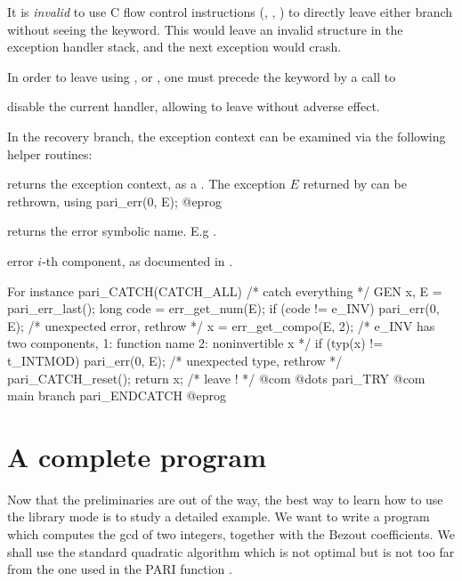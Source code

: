 \item It is \emph{invalid} to use C flow control instructions (,
, ) to directly leave either branch without seeing
the  keyword. This would leave an invalid structure in the
exception handler stack, and the next exception would crash.

\item In order to leave using ,  or ,
one must precede the keyword by a call to

 disable the current handler, allowing to leave
without adverse effect.


In the recovery branch, the exception context can be examined via the
following helper routines:

 returns the exception context, as a .
The exception $E$ returned by  can be rethrown, using
\bprog
  pari_err(0, E);
@eprog

 returns the error symbolic name. E.g
.

 error $i$-th component, as documented
in .

\noindent For instance
\bprog
 pari_CATCH(CATCH_ALL) { /* catch everything */
    GEN x, E = pari_err_last();
    long code = err_get_num(E);
    if (code != e_INV) pari_err(0, E); /* unexpected error, rethrow */
    x = err_get_compo(E, 2);
    /* e_INV has two components, 1: function name 2: noninvertible x */
    if (typ(x) != t_INTMOD) pari_err(0, E); /* unexpected type, rethrow */
    pari_CATCH_reset();
    return x; /* leave ! */
    @com @dots
 } pari_TRY {
   @com main branch
 }
 pari_ENDCATCH
@eprog

\section{A complete program}
\label{se:prog}

\noindent
Now that the preliminaries are out of the way, the best way to learn how to
use the library mode is to study a detailed example. We want to write a
program which computes the gcd of two integers, together with the Bezout
coefficients. We shall use the standard quadratic algorithm which is not
optimal but is not too far from the one used in the PARI function
.


